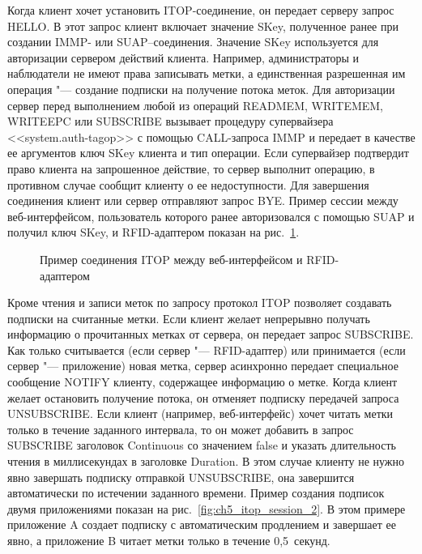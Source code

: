 Когда клиент хочет установить ITOP-соединение, он передает серверу запрос HELLO. В этот запрос клиент включает значение SKey, полученное ранее при создании IMMP- или SUAP--соединения. Значение SKey используется для авторизации сервером действий клиента. Например, администраторы и наблюдатели не имеют права записывать метки, а единственная разрешенная им операция "--- создание подписки на получение потока меток. Для авторизации сервер перед выполнением любой из операций READMEM, WRITEMEM, WRITEEPC или SUBSCRIBE вызывает процедуру супервайзера <<system.auth-tagop>> с помощью CALL-запроса IMMP и передает в качестве ее аргументов ключ SKey клиента и тип операции. Если супервайзер подтвердит право клиента на запрошенное действие, то сервер выполнит операцию, в противном случае сообщит клиенту о ее недоступности. Для завершения соединения клиент или сервер отправляют запрос BYE. Пример сессии между веб-интерфейсом, пользователь которого ранее авторизовался с помощью SUAP и получил ключ SKey, и RFID-адаптером показан на рис.~\ref{fig:ch5_itop_session_1}.

\begin{figure}[ht]
  \caption{Пример соединения ITOP между веб-интерфейсом и RFID-адаптером}
  \label{fig:ch5_itop_session_1}
\end{figure}

Кроме чтения и записи меток по запросу протокол ITOP позволяет создавать подписки на считанные метки. Если клиент желает непрерывно получать информацию о прочитанных метках от сервера, он передает запрос SUBSCRIBE. Как только считывается (если сервер "--- RFID-адаптер) или принимается (если сервер "--- приложение) новая метка, сервер асинхронно передает специальное сообщение NOTIFY клиенту, содержащее информацию о метке. Когда клиент желает остановить получение потока, он отменяет подписку передачей запроса UNSUBSCRIBE. Если клиент (например, веб-интерфейс) хочет читать метки только в течение заданного интервала, то он может добавить в запрос SUBSCRIBE заголовок Continuous со значением false и указать длительность чтения в миллисекундах в заголовке Duration. В этом случае клиенту не нужно явно завершать подписку отправкой UNSUBSCRIBE, она завершится автоматически по истечении заданного времени. Пример создания подписок двумя приложениями показан на рис.~\ref{fig:ch5_itop_session_2}. В этом примере приложение A создает подписку с автоматическим продлением и завершает ее явно, а приложение B читает метки только в течение 0,5~секунд.

